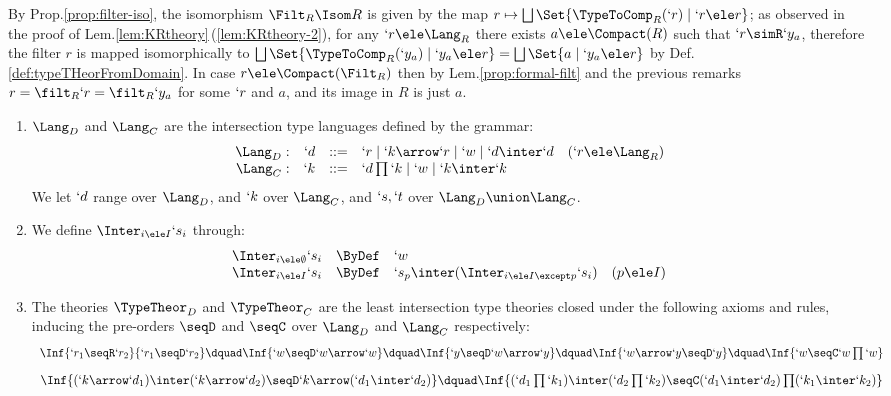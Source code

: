 \documentclass{CSML}
\begin{document}
 \begin{rem} \label{rem:Filt_R}
By Prop.\skp\ref{prop:filter-iso}, the isomorphism $\Filt_R \Isom R$ is given by the map $r \mapsto \bigsqcup \Set{\TypeToComp_R(`r) \mid `r \ele r}$; as observed in the proof of Lem.\skp\ref{lem:KRtheory}\,(\ref{lem:KRtheory-2}), for any $`r\ele \Lang_R$ there exists $a\ele \Compact(R)$ such that $`r \simR `y_a$, therefore the filter $r$ is mapped isomorphically to $\bigsqcup \Set{\TypeToComp_R(`y_a) \mid `y_a \ele r} = \bigsqcup \Set{a \mid `y_a \ele r}$ by Def.\skp\ref{def:typeTHeorFromDomain}. 
In case $r \ele \Compact(\Filt_R)$ then by Lem.\skp\ref{prop:formal-filt} and the previous remarks $r = \filt_R`r = \filt_R`y_a$ for some $`r$ and $a$, and its image in $R$ is just $a$. 
 \end{rem}

 \begin{defi}  \label{def:typeTheories}\hfill
 \begin{enumerate}
 \item
$\Lang_D$ and $\Lang_C$ are the intersection type languages defined by the grammar:
%
 \[ \begin{array}{r@{\quad}rcll} 
 \Lang_D: & `d & :: =& `r \mid `k\arrow `r \mid `w \mid `d\inter `d & (`r \ele \Lang_R) \\
 \Lang_C: & `k & :: =& `d\prod `k \mid `w \mid `k \inter `k 
 \end{array} \]
We let $`d$ range over $\Lang_D$, and $`k$ over $\Lang_C$, and $`s,`t$ over $\Lang_D \union \Lang_C$.

 \item
We define $\Inter_{i \ele I}`s_i$ through:
%
 \[ \begin{array}{rcl@{\quad}l}
\Inter_{i \ele \emptyset}`s_i &\ByDef& `w \\
\Inter_{i \ele I}`s_i &\ByDef& `s_p \inter (\Inter_{i \ele I\except p}`s_i) & (p \ele I) 
 \end{array} \]

 \item
The theories $\TypeTheor_D$ and $ \TypeTheor_C$ are the least intersection type theories closed under the following axioms and rules, inducing the pre-orders $\seqD$ and $ \seqC $ over $\Lang_D$ and $\Lang_C$ respectively: 
%
 \[ \begin{array}{c@{\dquad}c@{\dquad}c@{\dquad}c@{\dquad}c}
\Inf	{ `r_1 \seqR `r_2 }
	{ `r_1 \seqD `r_2 }
	&
\Inf	{ `w \seqD `w\arrow `w }
	&
\Inf	{ `y \seqD `w\arrow `y }
	&
\Inf	{ `w\arrow `y \seqD `y }
	&
\Inf	{ `w \seqC `w\prod `w }
 \end{array} \]
%
 \[ \begin{array}{c@{\dquad}c}
\Inf	{(`k\arrow `d_1) \inter (`k\arrow `d_2) \seqD `k\arrow(`d_1 \inter`d_2) }
	&
\Inf {(`d_1\prod `k_1) \inter (`d_2\prod `k_2) \seqC (`d_1 \inter `d_2)\prod (`k_1 \inter `k_2)}
 \end{array} \]


\end{enumerate}
\end{defi}
\end{document}

